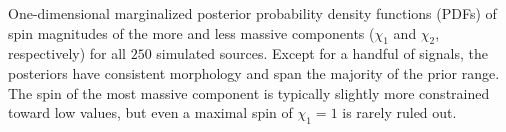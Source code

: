 \label{fig:spinPDF} One-dimensional marginalized posterior probability density functions (PDFs) of spin magnitudes of the more and less massive components ($\chi_1$ and $\chi_2$, respectively) for all $250$ simulated sources. Except for a handful of signals, the posteriors have consistent morphology and span the majority of the prior range.  The spin of the most massive component is typically slightly more constrained toward low values, but even a maximal spin of $\chi_1 = 1$ is rarely ruled out.
  